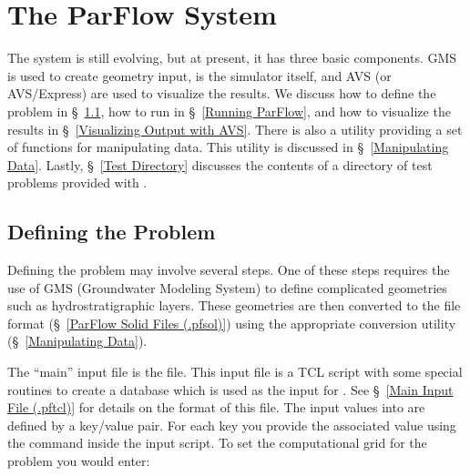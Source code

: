 
\chapter{The ParFlow System}
\label{The ParFlow System}

The \parflow{} system is still evolving, but at present,
it has three basic components.  GMS is used to create geometry input,
\parflow{} is the simulator itself, and AVS (or AVS/Express) are used
to visualize the results.  We discuss how to define the problem in
\S~\ref{Defining the Problem}, how to run \parflow{} in
\S~\ref{Running ParFlow}, and how to visualize the results in
\S~\ref{Visualizing Output with AVS}.  There is also a utility providing a set
of functions for manipulating \parflow{} data.  This utility is discussed in 
\S~\ref{Manipulating Data}.  Lastly, \S~\ref{Test Directory} discusses the
contents of a directory of test problems provided with \parflow{}.


\section{Defining the Problem}
\label{Defining the Problem}

Defining the problem may involve several steps.
One of these steps requires the use of
GMS (Groundwater Modeling System) \cite{GMS94tut,GMS95ref}
to define complicated geometries such as hydrostratigraphic layers.
These geometries are then converted to the
 file format (\S~\ref{ParFlow Solid Files (.pfsol)})
using the appropriate \pftools{} conversion utility
(\S~\ref{Manipulating Data}).

The ``main'' \parflow{} input file is the  file.
This input file is a TCL script with some special routines to
create a database which is used as the input for \parflow{}.
See \S~\ref{Main Input File (.pftcl)} for details on the format
of this file.
The input values into \parflow{} are defined by a key/value pair.  For
each key you provide the associated value using the  command
inside the input script.  To set the computational grid for the problem
you would enter:

